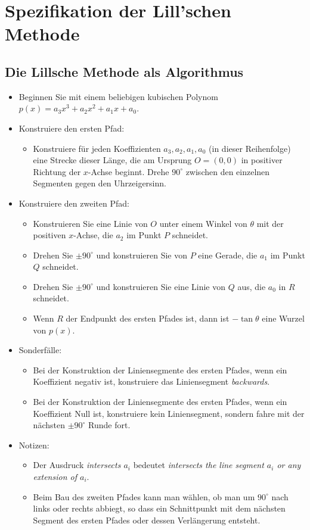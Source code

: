 
\section{Spezifikation der Lill'schen Methode}\label{s.method}

\subsection{Die Lillsche Methode als Algorithmus}
\begin{itemize}
\item Beginnen Sie mit einem beliebigen kubischen Polynom $p(x)=a_3x^3+a_2x^2+a_1x+a_0$.
\item Konstruiere den ersten Pfad:
\begin{itemize}
\item Konstruiere für jeden Koeffizienten $a_3,a_2,a_1,a_0$ (in dieser Reihenfolge) eine Strecke dieser Länge, die am Ursprung $O=(0,0)$ in positiver Richtung der $x$-Achse beginnt. Drehe $90^\circ$ zwischen den einzelnen Segmenten gegen den Uhrzeigersinn.
\end{itemize}
\item Konstruiere den zweiten Pfad:
\begin{itemize}
\item Konstruieren Sie eine Linie von $O$ unter einem Winkel von $\theta$ mit der positiven $x$-Achse, die $a_2$ im Punkt $P$ schneidet.
\item Drehen Sie $\pm 90^\circ$ und konstruieren Sie von $P$ eine Gerade, die $a_1$ im Punkt $Q$ schneidet.
\item Drehen Sie $\pm 90^\circ$ und konstruieren Sie eine Linie von $Q$ aus, die $a_0$ in $R$ schneidet.
\item Wenn $R$ der Endpunkt des ersten Pfades ist, dann ist $-\tan\theta$ eine Wurzel von $p(x)$.
\end{itemize}
\item Sonderfälle:
\begin{itemize}
\item Bei der Konstruktion der Liniensegmente des ersten Pfades, wenn ein Koeffizient negativ ist, konstruiere das Liniensegment \emph{backwards}.
\item Bei der Konstruktion der Liniensegmente des ersten Pfades, wenn ein Koeffizient Null ist, konstruiere kein Liniensegment, sondern fahre mit der nächsten $\pm 90^\circ$ Runde fort.
\end{itemize}
\item Notizen:
\begin{itemize}
\item Der Ausdruck \emph{intersects $a_i$} bedeutet \emph{intersects the line segment $a_i$ or any extension of $a_i$}.
\item Beim Bau des zweiten Pfades kann man wählen, ob man um $90^\circ$ nach links oder rechts abbiegt, so dass ein Schnittpunkt mit dem nächsten Segment des ersten Pfades oder dessen Verlängerung entsteht.
\end{itemize}
\end{itemize}


